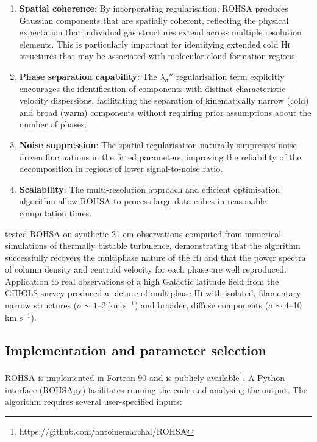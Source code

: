 \begin{enumerate}
	\item \textbf{Spatial coherence}: By incorporating regularisation, ROHSA produces Gaussian components that are spatially coherent, reflecting the physical expectation that individual gas structures extend across multiple resolution elements. This is particularly important for identifying extended cold \textrm{H\textsc{i}} structures that may be associated with molecular cloud formation regions.
	
	\item \textbf{Phase separation capability}: The $\lambda_\sigma''$ regularisation term explicitly encourages the identification of components with distinct characteristic velocity dispersions, facilitating the separation of kinematically narrow (cold) and broad (warm) components without requiring prior assumptions about the number of phases.
	
	\item \textbf{Noise suppression}: The spatial regularisation naturally suppresses noise-driven fluctuations in the fitted parameters, improving the reliability of the decomposition in regions of lower signal-to-noise ratio.
	
	\item \textbf{Scalability}: The multi-resolution approach and efficient optimisation algorithm allow ROHSA to process large data cubes in reasonable computation times.
\end{enumerate}

\noindent \citet{Marchal2019} tested ROHSA on synthetic 21 cm observations computed from numerical simulations of thermally bistable turbulence, demonstrating that the algorithm successfully recovers the multiphase nature of the \textrm{H\textsc{i}} and that the power spectra of column density and centroid velocity for each phase are well reproduced. Application to real observations of a high Galactic latitude field from the GHIGLS survey produced a picture of multiphase \textrm{H\textsc{i}} with isolated, filamentary narrow structures ($\sigma \sim 1$--2 km s$^{-1}$) and broader, diffuse components ($\sigma \sim 4$--10 km s$^{-1}$).

\subsection{Implementation and parameter selection}

ROHSA is implemented in Fortran 90 and is publicly available\footnote{https://github.com/antoinemarchal/ROHSA}. A Python interface (ROHSApy) facilitates running the code and analysing the output. The algorithm requires several user-specified inputs:

